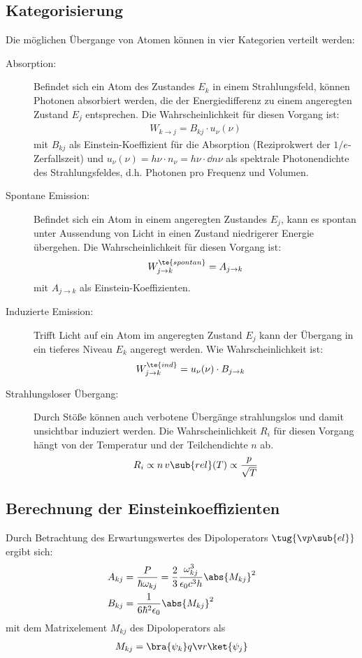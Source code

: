 \documentclass[twocolumn]{summery_4.1}
\begin{document}
\subsection{Kategorisierung}
Die möglichen Übergange von Atomen können in vier Kategorien verteilt werden:
\begin{description}
    \item[Absorption:] Befindet sich ein Atom des Zustandes $E_k$ in einem Strahlungsfeld, können Photonen absorbiert
    werden, die der Energiedifferenz zu einem angeregten Zustand $E_j$ entsprechen. Die Wahrscheinlichkeit für diesen Vorgang ist:
    \begin{align*}
        W_{k\to j} = B_{kj}\cdot u_\nu (\nu)
    \end{align*}
    mit \(B_{kj}\) als Einstein-Koeffizient für die Absorption (Reziprokwert der $1/e$-Zerfallszeit) und \(u_\nu(\nu)=h\nu\cdot n_\nu= h\nu \cdot \dd n\nu \) als spektrale Photonendichte des Strahlungsfeldes, d.h. Photonen pro Frequenz und Volumen. 
    \item[Spontane Emission:] Befindet sich ein Atom in einem angeregten Zustandes $E_j$, kann es spontan unter Aussendung von Licht in einen Zustand niedrigerer Energie übergehen. Die Wahrscheinlichkeit für diesen Vorgang ist:
    \begin{align*}
        W_{j\to k}^{\te{spontan}} = A_{j\to k}    
    \end{align*} mit \(A_{j\to k }\) als Einstein-Koeffizienten.
    \item[Induzierte Emission:] Trifft Licht auf ein Atom im angeregten Zustand $E_j$ kann der Übergang in ein tieferes Niveau $E_k$ angeregt werden. Wie Wahrscheinlichkeit ist:
    \begin{align*}
            W_{j\to k }^\te{ind} &= u_\nu (\nu) \cdot B_{j\to k }
    \end{align*}
    \item[Strahlungsloser Übergang:] Durch Stöße können auch verbotene Übergänge strahlungslos und damit unsichtbar induziert
    werden. Die Wahrscheinlichkeit \(R_i\) für diesen Vorgang hängt von der Temperatur und der Teilchendichte \(n\) ab.
    \begin{align*}
        R_i \propto n \,v\sub{rel}(T)\propto \frac{p}{\sqrt T}
    \end{align*}
\end{description}

\subsection{Berechnung der Einsteinkoeffizienten}
Durch Betrachtung des Erwartungswertes des Dipoloperators \(\tug{\v p\sub{el}}\) ergibt sich: 
\begin{align*}
    A_{kj} &= \frac{P}{\hbar \omega_{kj}}=\frac23 \frac{\omega_{kj}^3}{\epsilon_0 c^3 h}\abs{M_{kj}}^2\\
    B_{kj} &= \frac{1}{6\hbar^2 \epsilon_0} \abs{M_{kj}}^2 
\end{align*}
mit dem Matrixelement \(M_{kj}\) des Dipoloperators als 
\begin{align*}
    M_{kj} = \bra{\psi_k} q\v r \ket{\psi_j}
\end{align*}
\end{document}
